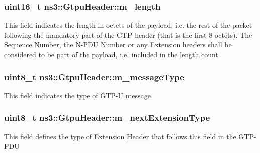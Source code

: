 \subsubsection[{\texorpdfstring{m\+\_\+length}{m_length}}]{\setlength{\rightskip}{0pt plus 5cm}uint16\+\_\+t ns3\+::\+Gtpu\+Header\+::m\+\_\+length\hspace{0.3cm}{\ttfamily [private]}}\hypertarget{classns3_1_1GtpuHeader_ab6f0dc585ae24ecbdc8dc8fb12bcf54f}{}\label{classns3_1_1GtpuHeader_ab6f0dc585ae24ecbdc8dc8fb12bcf54f}
This field indicates the length in octets of the payload, i.\+e. the rest of the packet following the mandatory part of the G\+TP header (that is the first 8 octets). The Sequence Number, the N-\/\+P\+DU Number or any Extension headers shall be considered to be part of the payload, i.\+e. included in the length count 
\subsubsection[{\texorpdfstring{m\+\_\+message\+Type}{m_messageType}}]{\setlength{\rightskip}{0pt plus 5cm}uint8\+\_\+t ns3\+::\+Gtpu\+Header\+::m\+\_\+message\+Type\hspace{0.3cm}{\ttfamily [private]}}\hypertarget{classns3_1_1GtpuHeader_a5295b542b750d59ed3dd62cfa33e1413}{}\label{classns3_1_1GtpuHeader_a5295b542b750d59ed3dd62cfa33e1413}
This field indicates the type of G\+T\+P-\/U message 
\subsubsection[{\texorpdfstring{m\+\_\+next\+Extension\+Type}{m_nextExtensionType}}]{\setlength{\rightskip}{0pt plus 5cm}uint8\+\_\+t ns3\+::\+Gtpu\+Header\+::m\+\_\+next\+Extension\+Type\hspace{0.3cm}{\ttfamily [private]}}\hypertarget{classns3_1_1GtpuHeader_a0fd669943a74011403a8be717e7f41c0}{}\label{classns3_1_1GtpuHeader_a0fd669943a74011403a8be717e7f41c0}
This field defines the type of Extension \hyperlink{classns3_1_1Header}{Header} that follows this field in the G\+T\+P-\/\+P\+DU 
